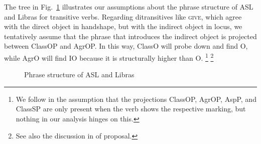 \documentclass[output=paper]{langscibook}
\begin{document}
The tree in Fig.~\ref{lasz:fig:1} illustrates our assumptions about the phrase
structure of ASL and Libras for transitive verbs. Regarding
ditransitives like \textsc{give}, which agree with the direct object in
handshape, but with the indirect object in locus, we tentatively assume
that the phrase that introduces the indirect object is projected between 
ClassOP and AgrOP. In this way, ClassO will probe down and find O,
while AgrO will find IO because it is structurally higher than O.%
\footnote{
    We follow \citet{Quadros.etal.2004} in the assumption that the projections
    ClassOP, AgrOP, AspP, and ClassSP are only present when the verb shows the respective marking,
    but nothing in our analysis hinges on this.
}%
\footnote{
    See also the discussion in \citet{Pfau.etal.2018} of  proposal.
}

\begin{figure}
    \caption{Phrase structure of ASL and Libras}
    \label{lasz:fig:1}
\end{figure}
\end{document}
